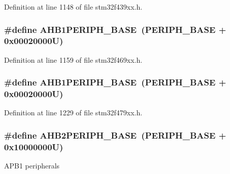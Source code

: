 Definition at line 1148 of file stm32f439xx.\+h.

\subsubsection[{\texorpdfstring{A\+H\+B1\+P\+E\+R\+I\+P\+H\+\_\+\+B\+A\+SE}{AHB1PERIPH_BASE}}]{\setlength{\rightskip}{0pt plus 5cm}\#define A\+H\+B1\+P\+E\+R\+I\+P\+H\+\_\+\+B\+A\+SE~({\bf P\+E\+R\+I\+P\+H\+\_\+\+B\+A\+SE} + 0x00020000\+U)}\hypertarget{group___peripheral__memory__map_ga811a9a4ca17f0a50354a9169541d56c4}{}\label{group___peripheral__memory__map_ga811a9a4ca17f0a50354a9169541d56c4}


Definition at line 1159 of file stm32f469xx.\+h.

\subsubsection[{\texorpdfstring{A\+H\+B1\+P\+E\+R\+I\+P\+H\+\_\+\+B\+A\+SE}{AHB1PERIPH_BASE}}]{\setlength{\rightskip}{0pt plus 5cm}\#define A\+H\+B1\+P\+E\+R\+I\+P\+H\+\_\+\+B\+A\+SE~({\bf P\+E\+R\+I\+P\+H\+\_\+\+B\+A\+SE} + 0x00020000\+U)}\hypertarget{group___peripheral__memory__map_ga811a9a4ca17f0a50354a9169541d56c4}{}\label{group___peripheral__memory__map_ga811a9a4ca17f0a50354a9169541d56c4}


Definition at line 1229 of file stm32f479xx.\+h.

\subsubsection[{\texorpdfstring{A\+H\+B2\+P\+E\+R\+I\+P\+H\+\_\+\+B\+A\+SE}{AHB2PERIPH_BASE}}]{\setlength{\rightskip}{0pt plus 5cm}\#define A\+H\+B2\+P\+E\+R\+I\+P\+H\+\_\+\+B\+A\+SE~({\bf P\+E\+R\+I\+P\+H\+\_\+\+B\+A\+SE} + 0x10000000\+U)}\hypertarget{group___peripheral__memory__map_gaeedaa71d22a1948492365e2cd26cfd46}{}\label{group___peripheral__memory__map_gaeedaa71d22a1948492365e2cd26cfd46}
A\+P\+B1 peripherals 

